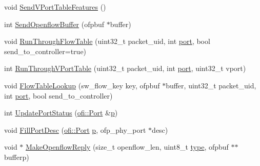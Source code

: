 \begin{DoxyCompactItemize}
\item 
void \hyperlink{classns3_1_1OpenFlowSwitchNetDevice_a51d89daf86d957758b761811e26a677a}{Send\+V\+Port\+Table\+Features} ()
\item 
int \hyperlink{classns3_1_1OpenFlowSwitchNetDevice_a966a9b3636b35bf55372ee1f77e2ab89}{Send\+Openflow\+Buffer} (ofpbuf $\ast$buffer)
\item 
void \hyperlink{classns3_1_1OpenFlowSwitchNetDevice_a3855859a3625d566e4e1f9297d3350a8}{Run\+Through\+Flow\+Table} (uint32\+\_\+t packet\+\_\+uid, int \hyperlink{visualizer-ideas_8txt_a21ff1c530daf8435e00048b7fc2c58e3}{port}, bool send\+\_\+to\+\_\+controller=true)
\item 
int \hyperlink{classns3_1_1OpenFlowSwitchNetDevice_ab8f468f2c29abacad719a6703cf0169c}{Run\+Through\+V\+Port\+Table} (uint32\+\_\+t packet\+\_\+uid, int \hyperlink{visualizer-ideas_8txt_a21ff1c530daf8435e00048b7fc2c58e3}{port}, uint32\+\_\+t vport)
\item 
void \hyperlink{classns3_1_1OpenFlowSwitchNetDevice_a679df5c2648b42921feee537d08b99c6}{Flow\+Table\+Lookup} (sw\+\_\+flow\+\_\+key key, ofpbuf $\ast$buffer, uint32\+\_\+t packet\+\_\+uid, int \hyperlink{visualizer-ideas_8txt_a21ff1c530daf8435e00048b7fc2c58e3}{port}, bool send\+\_\+to\+\_\+controller)
\item 
int \hyperlink{classns3_1_1OpenFlowSwitchNetDevice_a58d57963f1369e1fa389c6b4ae940033}{Update\+Port\+Status} (\hyperlink{structns3_1_1ofi_1_1Port}{ofi\+::\+Port} \&\hyperlink{lte__link__budget__x2__handover__measures_8m_ac9de518908a968428863f829398a4e62}{p})
\item 
void \hyperlink{classns3_1_1OpenFlowSwitchNetDevice_ae37ac2efa897a24c2217a611a9a4f2c6}{Fill\+Port\+Desc} (\hyperlink{structns3_1_1ofi_1_1Port}{ofi\+::\+Port} \hyperlink{lte__link__budget__x2__handover__measures_8m_ac9de518908a968428863f829398a4e62}{p}, ofp\+\_\+phy\+\_\+port $\ast$desc)
\item 
void $\ast$ \hyperlink{classns3_1_1OpenFlowSwitchNetDevice_a558a8205a94a7eebaf8961b667443d52}{Make\+Openflow\+Reply} (size\+\_\+t openflow\+\_\+len, uint8\+\_\+t \hyperlink{visualizer-ideas_8txt_add98db9e15e2a58cf2b57623e7aa893a}{type}, ofpbuf $\ast$$\ast$bufferp)
\end{DoxyCompactItemize}
